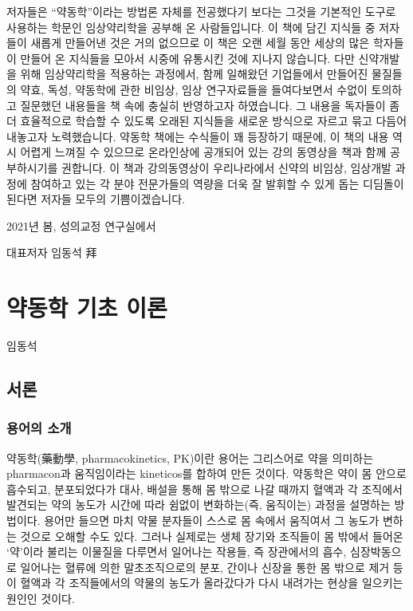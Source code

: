 \documentclass[
  11pt,
  krantz2, a4paper, twoside]{krantz}
\theoremstyle{definition}
\theoremstyle{definition}
\theoremstyle{definition}
\theoremstyle{definition}
\theoremstyle{remark}
\begin{document}
저자들은 ``약동학''이라는 방법론 자체를 전공했다기 보다는 그것을 기본적인
도구로 사용하는 학문인 임상약리학을 공부해 온 사람들입니다. 이 책에 담긴
지식들 중 저자들이 새롭게 만들어낸 것은 거의 없으므로 이 책은 오랜 세월
동안 세상의 많은 학자들이 만들어 온 지식들을 모아서 시중에 유통시킨 것에
지나지 않습니다. 다만 신약개발을 위해 임상약리학을 적용하는 과정에서,
함께 일해왔던 기업들에서 만들어진 물질들의 약효, 독성, 약동학에 관한
비임상, 임상 연구자료들을 들여다보면서 수없이 토의하고 질문했던 내용들을
책 속에 충실히 반영하고자 하였습니다. 그 내용을 독자들이 좀 더
효율적으로 학습할 수 있도록 오래된 지식들을 새로운 방식으로 자르고 묶고
다듬어 내놓고자 노력했습니다. 약동학 책에는 수식들이 꽤 등장하기 때문에,
이 책의 내용 역시 어렵게 느껴질 수 있으므로 온라인상에 공개되어 있는
강의 동영상을 책과 함께 공부하시기를 권합니다. 이 책과 강의동영상이
우리나라에서 신약의 비임상, 임상개발 과정에 참여하고 있는 각 분야
전문가들의 역량을 더욱 잘 발휘할 수 있게 돕는 디딤돌이 된다면 저자들
모두의 기쁨이겠습니다.

\hfill 2021년 봄, 성의교정 연구실에서

\hfill 대표저자 임동석 拜

\normalsize

\mainmatter

\hypertarget{principle}{%
\chapter{약동학 기초 이론}\label{principle}}

\Large\hfill

임동석
\normalsize

\hypertarget{uxc11cuxb860}{%
\section{서론}\label{uxc11cuxb860}}

\hypertarget{uxc6a9uxc5b4uxc758-uxc18cuxac1c}{%
\subsection{용어의 소개}\label{uxc6a9uxc5b4uxc758-uxc18cuxac1c}}


약동학(藥動學, pharmacokinetics, PK)이란 용어는 그리스어로 약을 의미하는 pharmacon과 움직임이라는 kineticos를 합하여 만든 것이다. 약동학은 약이 몸 안으로 흡수되고, 분포되었다가 대사, 배설을 통해 몸 밖으로 나갈 때까지 혈액과 각 조직에서 발견되는 약의 농도가 시간에 따라 쉼없이 변화하는(즉, 움직이는) 과정을 설명하는 방법이다. 용어만 들으면 마치 약물 분자들이 스스로 몸 속에서 움직여서 그 농도가 변하는 것으로 오해할 수도 있다. 그러나 실제로는 생체 장기와 조직들이 몸 밖에서 들어온 `약'이라 불리는 이물질을 다루면서 일어나는 작용들, 즉 장관에서의 흡수, 심장박동으로 일어나는 혈류에 의한 말초조직으로의 분포, 간이나 신장을 통한 몸 밖으로 제거 등이 혈액과 각 조직들에서의 약물의 농도가 올라갔다가 다시 내려가는 현상을 일으키는 원인인 것이다.
\end{document}
